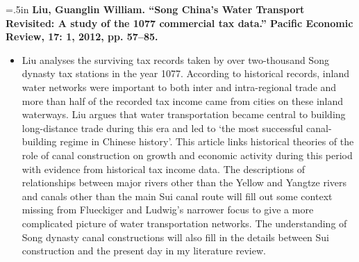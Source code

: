 \documentclass[11pt]{article}
\begin{document}
\hangindent=.5in
\textbf{Liu, Guanglin William. “Song China’s Water Transport Revisited: A study of the 1077 commercial tax data.” Pacific Economic Review, 17: 1, 2012, pp. 57–85.}
\begin{itemize}
    \item[~]
    Liu analyses the surviving tax records taken by over two-thousand Song dynasty tax stations in the year 1077. According to historical records, inland water networks were important to both inter and intra-regional trade and more than half of the recorded tax income came from cities on these inland waterways. Liu argues that water transportation became central to building long-distance trade during this era and led to ‘the most successful canal-building regime in Chinese history’. This article links historical theories of the role of canal construction on growth and economic activity during this period with evidence from historical tax income data. The descriptions of relationships between major rivers other than the Yellow and Yangtze rivers and canals other than the main Sui canal route will fill out some context missing from Flueckiger and Ludwig’s narrower focus to give a more complicated picture of water transportation networks. The understanding of Song dynasty canal constructions will also fill in the details between Sui construction and the present day in my literature review. 

\end{itemize}
\end{document}
